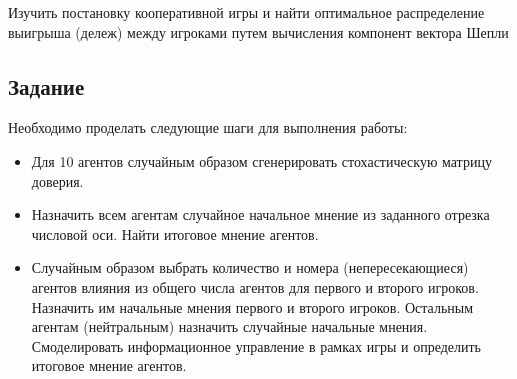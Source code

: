 
Изучить постановку кооперативной игры и найти оптимальное распределение
выигрыша (дележ) между игроками путем вычисления компонент вектора Шепли

\subsection*{Задание}

Необходимо проделать следующие шаги для выполнения работы:

\begin{itemize}
  \item Для 10 агентов случайным образом сгенерировать стохастическую матрицу доверия.
  \item Назначить всем агентам случайное начальное мнение из заданного
        отрезка числовой оси. Найти итоговое мнение агентов.
  \item Случайным образом выбрать количество и номера (непересекающиеся)
        агентов влияния из общего числа агентов для первого и второго игроков.
        Назначить им начальные мнения первого и второго игроков. Остальным
        агентам (нейтральным) назначить случайные начальные мнения.
        Смоделировать информационное управление в рамках игры и
        определить итоговое мнение агентов.
\end{itemize}
